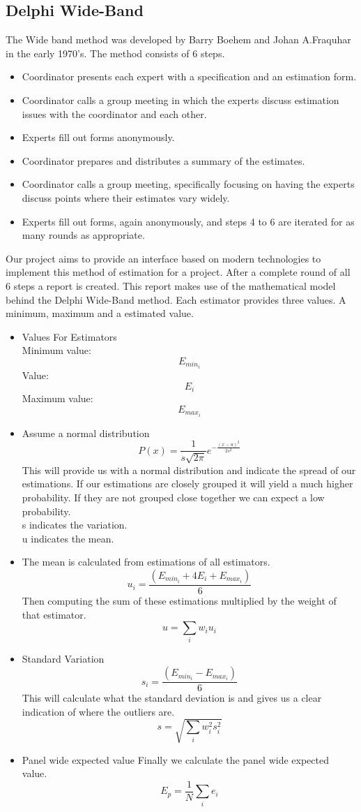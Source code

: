 \subsection{Delphi Wide-Band}
The Wide band method was developed by Barry Boehem and Johan A.Fraquhar in the early 1970's. The method consists of 6 steps.
\begin{itemize}
	\item{Coordinator presents each expert with a specification and an estimation form.}
	\item{Coordinator calls a group meeting in which the experts discuss estimation issues with the coordinator and each other.}
	\item{Experts fill out forms anonymously.}
	\item{Coordinator prepares and distributes a summary of the estimates.}
	\item{Coordinator calls a group meeting, specifically focusing on having the experts discuss points where their estimates vary widely.}
	\item{Experts fill out forms, again anonymously, and steps 4 to 6 are iterated for as many rounds as appropriate.}
\end{itemize}
Our project aims to provide an interface based on modern technologies to implement this method of estimation for a project. After a complete round of all 6 steps a report is created. This report makes use of the mathematical model behind the Delphi Wide-Band method. Each estimator provides three values. A minimum, maximum and a estimated value.
\begin{itemize}
	\item{Values For Estimators}
	\\Minimum value: \[E_{min_i}\]
	Value: \[E_i\]
	Maximum value: \[E_{max_i}\]
	\item{Assume a normal distribution}
	\[ P(x) = \frac{1}{s\sqrt{2\pi}}e^{-\frac{(x-u)^2}{2s^2}}\]
	This will provide us with a normal distribution and indicate the spread of our estimations. If our estimations are closely grouped it will yield a much higher probability. If they are not grouped close together we can expect a low probability.
	\\s indicates the variation.
	\\u indicates the mean.
	\item{The mean}
	is calculated from estimations  of all estimators.
	\[ u_i = \frac{(E_{min_i}+4E_i+E_{max_i})}{6}\]
	Then computing the sum of these estimations multiplied by the weight of that estimator.
	\[ u = \sum_{i} w_iu_i\]
	\item{Standard Variation}
	\[ s_i = \frac{(E_{min_i}-E_{max_i})}{6}\]
	This will calculate what the standard deviation is and gives us a clear indication of where the outliers are.
	\[ s = \sqrt{\sum_{i} w_i^2s_i^2}\]
	\item{Panel wide expected value}
	Finally we calculate the panel wide expected value.
	\[E_p = \frac{1}{N}\sum_{i}e_i\]
\end{itemize}
